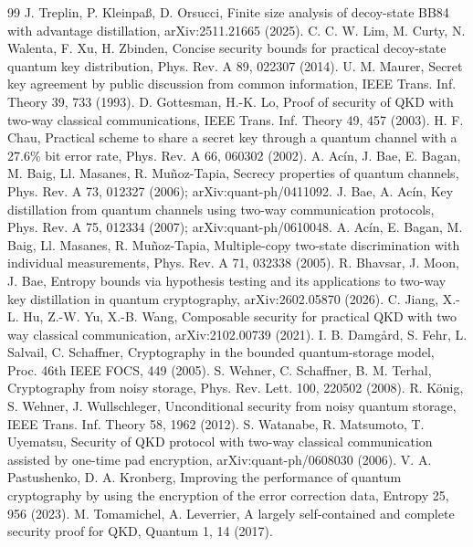 \documentclass[aps,pra,twocolumn,superscriptaddress,nofootinbib]{revtex4-2}
\begin{document}
\begin{thebibliography}{99}
 J. Treplin, P. Kleinpaß, D. Orsucci, Finite size analysis of decoy-state BB84 with advantage distillation, arXiv:2511.21665 (2025).
 C. C. W. Lim, M. Curty, N. Walenta, F. Xu, H. Zbinden, Concise security bounds for practical decoy-state quantum key distribution, Phys. Rev. A 89, 022307 (2014).
 U. M. Maurer, Secret key agreement by public discussion from common information, IEEE Trans. Inf. Theory 39, 733 (1993).
 D. Gottesman, H.-K. Lo, Proof of security of QKD with two-way classical communications, IEEE Trans. Inf. Theory 49, 457 (2003).
 H. F. Chau, Practical scheme to share a secret key through a quantum channel with a 27.6\% bit error rate, Phys. Rev. A 66, 060302 (2002).
 A. Acín, J. Bae, E. Bagan, M. Baig, Ll. Masanes, R. Muñoz-Tapia, Secrecy properties of quantum channels, Phys. Rev. A 73, 012327 (2006); arXiv:quant-ph/0411092.
 J. Bae, A. Acín, Key distillation from quantum channels using two-way communication protocols, Phys. Rev. A 75, 012334 (2007); arXiv:quant-ph/0610048.
 A. Acín, E. Bagan, M. Baig, Ll. Masanes, R. Muñoz-Tapia, Multiple-copy two-state discrimination with individual measurements, Phys. Rev. A 71, 032338 (2005).
 R. Bhavsar, J. Moon, J. Bae, Entropy bounds via hypothesis testing and its applications to two-way key distillation in quantum cryptography, arXiv:2602.05870 (2026).
 C. Jiang, X.-L. Hu, Z.-W. Yu, X.-B. Wang, Composable security for practical QKD with two way classical communication, arXiv:2102.00739 (2021).
 I. B. Damgård, S. Fehr, L. Salvail, C. Schaffner, Cryptography in the bounded quantum-storage model, Proc. 46th IEEE FOCS, 449 (2005).
 S. Wehner, C. Schaffner, B. M. Terhal, Cryptography from noisy storage, Phys. Rev. Lett. 100, 220502 (2008).
 R. König, S. Wehner, J. Wullschleger, Unconditional security from noisy quantum storage, IEEE Trans. Inf. Theory 58, 1962 (2012).
 S. Watanabe, R. Matsumoto, T. Uyematsu, Security of QKD protocol with two-way classical communication assisted by one-time pad encryption, arXiv:quant-ph/0608030 (2006).
 V. A. Pastushenko, D. A. Kronberg, Improving the performance of quantum cryptography by using the encryption of the error correction data, Entropy 25, 956 (2023).
 M. Tomamichel, A. Leverrier, A largely self-contained and complete security proof for QKD, Quantum 1, 14 (2017).

\end{thebibliography}
\end{document}
